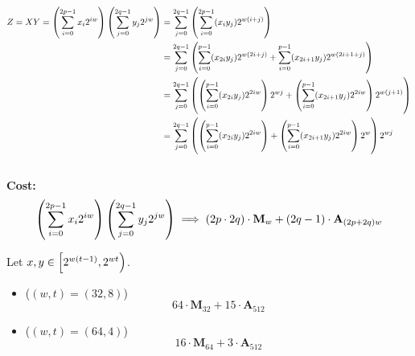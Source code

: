 \begin{align*}
Z=XY=\left(\sum_{i=0}^{2p-1}x_i2^{iw}\right)\left(\sum_{j=0}^{2q-1}y_j2^{jw}\right)&=\sum_{j=0}^{2q-1}\left(\sum_{i=0}^{2p-1}(x_iy_j)2^{w(i+j)}\right) \\
&=\sum_{j=0}^{2q-1}\left(\sum_{i=0}^{p-1}(x_{2i}y_j)2^{w(2i+j)}+\sum_{i=0}^{p-1}(x_{2i+1}y_j)2^{w(2i+1+j)}\right) \\
&=\sum_{j=0}^{2q-1}\left(\left(\sum_{i=0}^{p-1}(x_{2i}y_j)2^{2iw}\right)2^{wj}+\left(\sum_{i=0}^{p-1}(x_{2i+1}y_j)2^{2iw}\right)2^{w(j+1)}\right) \\
&=\sum_{j=0}^{2q-1}\left(\left(\sum_{i=0}^{p-1}(x_{2i}y_j)2^{2iw}\right)+\left(\sum_{i=0}^{p-1}(x_{2i+1}y_j)2^{2iw}\right)2^{w}\right)2^{wj} \\
\end{align*}
\\
\textbf{Cost:} \[
\left(\sum_{i=0}^{2p-1}x_i2^{iw}\right)\left(\sum_{j=0}^{2q-1}y_j2^{jw}\right)\implies (2p\cdot 2q)\cdot\textbf{M}_{w} + (2q-1)\cdot\textbf{A}_{(2p+2q)w}
\]

\begin{example}
Let $x,y\in\intco{2^{w(t-1)},2^{wt}}$.
\begin{itemize}
\item[] ($(w,t)=(32,8)$) \[
64\cdot\textbf{M}_{32} + 15\cdot\textbf{A}_{512}
\]
\item[] ($(w,t)=(64,4)$) \[
16\cdot\textbf{M}_{64} + 3\cdot\textbf{A}_{512}
\]
\end{itemize}
\end{example}








